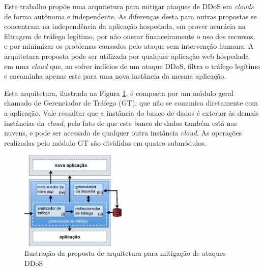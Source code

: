 



Este trabalho propõe uma arquitetura para mitigar ataques de DDoS em \emph{clouds} de forma autônoma e independente. As diferenças desta para outras propostas se concentram na independência da aplicação hospedada, em prover acurácia na filtragem de tráfego legítimo, por não onerar financeiramente o uso dos recursos, e por minimizar os problemas causados pelo ataque sem intervenção humana. A arquitetura proposta pode ser utilizada por qualquer aplicação web hospedada em uma \emph{cloud} que, ao sofrer indícios de um ataque DDoS, filtra o tráfego legítimo e encaminha apenas este para uma nova instância da mesma aplicação. 

Esta arquitetura, ilustrada na Figura \ref{fig:arq}, é composta por um módulo geral chamado de Gerenciador de Tráfego (GT), que não se comunica diretamente com a aplicação. Vale ressaltar que a instância do banco de dados é exterior às demais instâncias da \emph{cloud}, pelo fato de que este banco de dados também está nas nuvens, e pode ser acessado de qualquer outra instância \emph{cloud}. As operações realizadas pelo módulo GT são divididas em quatro submódulos.

\begin{figure}[h!]
\centering
\includegraphics[width=0.45\textwidth]{images/arq.eps}
\caption{Ilustração da proposta de arquitetura para mitigação de ataques DDoS}
\label{fig:arq}
\end{figure}


